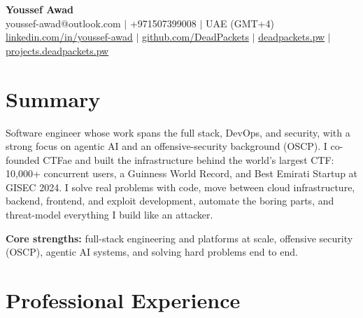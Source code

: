 \documentclass[10pt,a4paper]{article}
\begin{document}
\begin{center}
    {\Large \textbf{Youssef Awad}}\\[2pt]
    {\small youssef-awad@outlook.com $\mid$ +971507399008 $\mid$ UAE (GMT+4)}\\[2pt]
    {\small \href{https://www.linkedin.com/in/youssef-awad/}{linkedin.com/in/youssef-awad} $\mid$ \href{https://github.com/DeadPackets}{github.com/DeadPackets} $\mid$ \href{https://deadpackets.pw}{deadpackets.pw} $\mid$ \href{https://projects.deadpackets.pw}{projects.deadpackets.pw}}
\end{center}

\section{Summary}
{\small Software engineer whose work spans the full stack, DevOps, and security, with a strong focus on agentic AI and an offensive-security background (OSCP). I co-founded CTFae and built the infrastructure behind the world's largest CTF: 10,000+ concurrent users, a Guinness World Record, and Best Emirati Startup at GISEC 2024. I solve real problems with code, move between cloud infrastructure, backend, frontend, and exploit development, automate the boring parts, and threat-model everything I build like an attacker.}

\vspace{3pt}
{\small \textbf{Core strengths:} full-stack engineering and platforms at scale, offensive security (OSCP), agentic AI systems, and solving hard problems end to end.}

\section{Professional Experience}
\end{document}
